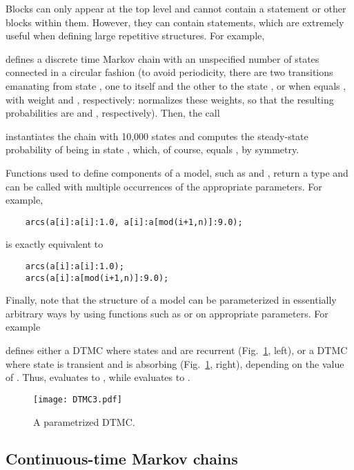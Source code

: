 Blocks can only appear at the top level and cannot contain a
 statement or other blocks within them.
However, they can contain  statements, which are
extremely useful when defining large repetitive structures.
For example,
%

%
defines a discrete time Markov chain with an unspecified number
 of states connected in a circular fashion
(to avoid periodicity, there are two transitions emanating from state
, one to itself and the other to the state ,
or  when  equals , with weight
 and , respectively:
{\smart} normalizes these weights, so that the resulting probabilities are
 and , respectively).
Then, the call
%

%
instantiates the chain  with 10,000 states and computes the
steady-state probability of being in state , which, of course,
equals , by symmetry.

Functions used to define components of a model, such as  and
, return a type  and can be called with multiple
occurrences of the appropriate parameters.
For example,
\begin{lstlisting}
    arcs(a[i]:a[i]:1.0, a[i]:a[mod(i+1,n)]:9.0);
\end{lstlisting}
is exactly equivalent to
\begin{lstlisting}
    arcs(a[i]:a[i]:1.0);
    arcs(a[i]:a[mod(i+1,n)]:9.0);
\end{lstlisting}


Finally, note that the structure of a model can be parameterized in essentially
arbitrary ways by using functions such as  or  on
appropriate parameters.
For example
%

%
defines either a DTMC where states  and  are recurrent
(Fig.~\ref{FIG:DTMC3}, left),
or a DTMC where state  is transient and  is absorbing
(Fig.~\ref{FIG:DTMC3}, right), depending on the value of .
Thus,  evaluates to , while 
evaluates to .

\begin{figure}
  \centering
  \texttt{[image: DTMC3.pdf]}
  \caption{A parametrized DTMC.}
  \label{FIG:DTMC3}
\end{figure}


\subsection{Continuous-time Markov chains} \label{SEC:CTMC}

